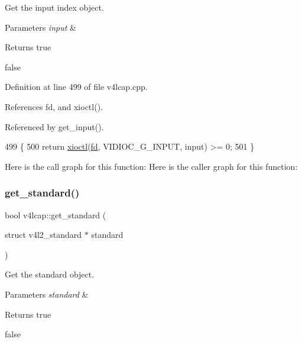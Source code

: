 Get the input index object. 


\begin{DoxyParams}{Parameters}
{\em input} & \\
\hline
\end{DoxyParams}
\begin{DoxyReturn}{Returns}
true 

false 
\end{DoxyReturn}


Definition at line 499 of file v4lcap.\+cpp.



References fd, and xioctl().



Referenced by get\+\_\+input().


\begin{DoxyCode}
499                                                  \{
500     \textcolor{keywordflow}{return} \hyperlink{classv4lcap_ab5aaa5a8c0df17f5ca57e0b5170232cb}{xioctl}(\hyperlink{classv4lcap_a38109593bde997dad13b3a461569573d}{fd}, VIDIOC\_G\_INPUT, input) >= 0;
501 \}
\end{DoxyCode}
Here is the call graph for this function\+:
Here is the caller graph for this function\+:
\mbox{\label{classv4lcap_ad3ae859cc6d6d99146619ba550514aab}} 
\subsubsection{\texorpdfstring{get\+\_\+standard()}{get\_standard()}}
{\footnotesize\ttfamily bool v4lcap\+::get\+\_\+standard (\begin{DoxyParamCaption}\item[{struct v4l2\+\_\+standard $\ast$}]{standard }\end{DoxyParamCaption})}



Get the standard object. 


\begin{DoxyParams}{Parameters}
{\em standard} & \\
\hline
\end{DoxyParams}
\begin{DoxyReturn}{Returns}
true 

false 
\end{DoxyReturn}


